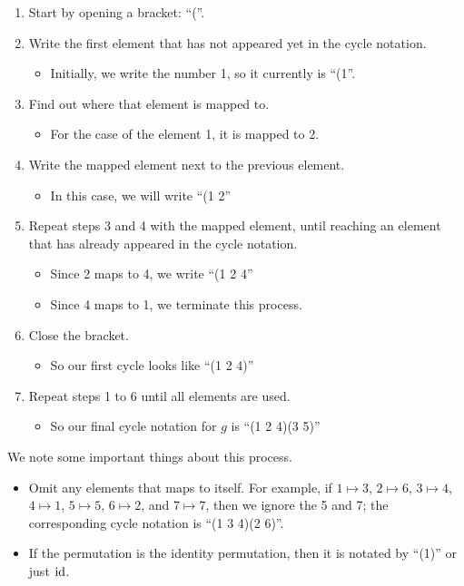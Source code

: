 \begin{enumerate}
    \item Start by opening a bracket: ``(''.
    \item Write the first element that has not appeared yet in the cycle notation.
    \begin{itemize}
        \item Initially, we write the number 1, so it currently is ``(1''.
    \end{itemize}
    \item Find out where that element is mapped to.
    \begin{itemize}
        \item For the case of the element 1, it is mapped to 2.
    \end{itemize}
    \item Write the mapped element next to the previous element.
    \begin{itemize}
        \item In this case, we will write ``(1 2''
    \end{itemize}
    \item Repeat steps 3 and 4 with the mapped element, until reaching an element that has already appeared in the cycle notation.
    \begin{itemize}
        \item Since 2 maps to 4, we write ``(1 2 4''
        \item Since 4 maps to 1, we terminate this process.
    \end{itemize}
    \item Close the bracket.
    \begin{itemize}
        \item So our first cycle looks like ``(1 2 4)''
    \end{itemize}
    \item Repeat steps 1 to 6 until all elements are used.
    \begin{itemize}
        \item So our final cycle notation for $g$ is ``(1 2 4)(3 5)''
    \end{itemize}
\end{enumerate}

We note some important things about this process.
\begin{itemize}
    \item Omit any elements that maps to itself. For example, if $1 \mapsto 3$, $2 \mapsto 6$, $3 \mapsto 4$, $4 \mapsto 1$, $5 \mapsto 5$, $6 \mapsto 2$, and $7 \mapsto 7$, then we ignore the 5 and 7; the corresponding cycle notation is ``(1 3 4)(2 6)''.
    \item If the permutation is the identity permutation, then it is notated by ``(1)'' or just $\mathrm{id}$.
\end{itemize}

